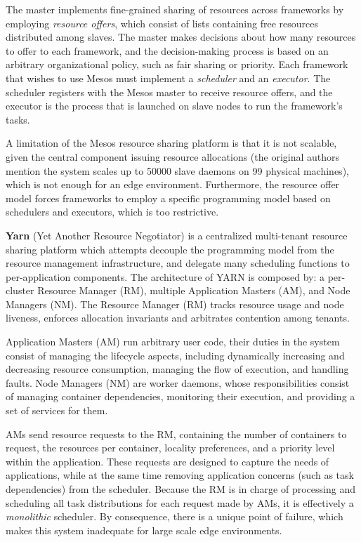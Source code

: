 The master implements fine-grained sharing of resources across frameworks by employing \textit{resource offers}, which consist of lists containing free resources distributed among slaves. The master makes decisions about how many resources to offer to each framework, and the decision-making process is based on an arbitrary organizational policy, such as fair sharing or priority. Each framework that wishes to use Mesos must implement a \textit{scheduler} and an \textit{executor}. The scheduler registers with the Mesos master to receive resource offers, and the executor is the process that is launched on slave nodes to run the framework's tasks.

A limitation of the Mesos resource sharing platform is that it is not scalable, given the central component issuing resource allocations (the original authors mention the system scales up to 50000 slave daemons on 99 physical machines), which is not enough for an edge environment. Furthermore, the resource offer model forces frameworks to employ a specific programming model based on schedulers and executors, which is too restrictive. 

\textbf{Yarn} (Yet Another Resource Negotiator) \cite{Vavilapalli2013ApacheHY} is a centralized multi-tenant resource sharing platform which attempts decouple the programming model from the resource management infrastructure, and delegate many scheduling functions to per-application components. The architecture of YARN is composed by: a per-cluster Resource Manager (RM), multiple Application Masters (AM), and Node Managers (NM). The Resource Manager (RM) tracks resource usage and node liveness, enforces allocation invariants and arbitrates contention among tenants. 

Application Masters (AM) run arbitrary user code, their duties in the system consist of managing the lifecycle aspects, including dynamically increasing and decreasing resource consumption, managing the flow of execution, and handling faults. Node Managers (NM) are worker daemons, whose responsibilities consist of managing container dependencies, monitoring their execution, and providing a set of services for them. 

AMs send resource requests to the RM, containing the number of containers to request, the resources per container, locality preferences, and a priority level within the application. These requests are designed to capture the needs of applications, while at the same time removing application concerns (such as task dependencies) from the scheduler. Because the RM is in charge of processing and scheduling all task distributions for each request made by AMs, it is effectively a \textit{monolithic} scheduler. By consequence, there is a unique point of failure, which makes this system inadequate for large scale edge environments.

